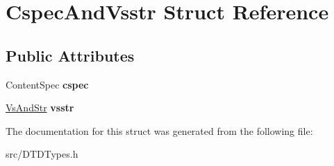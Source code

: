 \hypertarget{struct_cspec_and_vsstr}{\section{\-Cspec\-And\-Vsstr \-Struct \-Reference}
\label{struct_cspec_and_vsstr}
}
\subsection*{\-Public \-Attributes}
\begin{DoxyCompactItemize}
\item 
\hypertarget{struct_cspec_and_vsstr_a9908cf6534137de53228d565f293593f}{\-Content\-Spec {\bfseries cspec}}\label{struct_cspec_and_vsstr_a9908cf6534137de53228d565f293593f}

\item 
\hypertarget{struct_cspec_and_vsstr_ac25818b9e6c7b3ad41e3936f19ab2b09}{\hyperlink{struct_vs_and_str}{\-Vs\-And\-Str} {\bfseries vsstr}}\label{struct_cspec_and_vsstr_ac25818b9e6c7b3ad41e3936f19ab2b09}

\end{DoxyCompactItemize}


\-The documentation for this struct was generated from the following file\-:\begin{DoxyCompactItemize}
\item 
src/\-D\-T\-D\-Types.\-h\end{DoxyCompactItemize}
